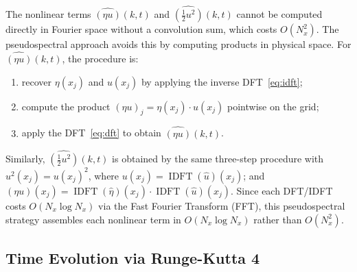 The nonlinear terms $\widehat{(\eta u)}(k,t)$ and $\widehat{(\frac{1}{2}u^2)}(k,t)$ cannot be computed directly in Fourier space without a convolution sum, which costs $O(N_x^2)$. The pseudospectral approach avoids this by computing products in physical space. For $\widehat{(\eta u)}(k,t)$, the procedure is:
\begin{enumerate}
    \item recover $\eta(x_j)$ and $u(x_j)$ by applying the inverse DFT~\eqref{eq:idft};
    \item compute the product $(\eta u)_j = \eta(x_j)\cdot u(x_j)$ pointwise on the grid;
    \item apply the DFT~\eqref{eq:dft} to obtain $\widehat{(\eta u)}(k,t)$.
\end{enumerate}
Similarly, $\widehat{(\frac{1}{2}u^2)}(k,t)$ is obtained by the same three-step procedure with $u^2(x_j) = u(x_j)^2$, where $u(x_j) = \operatorname{IDFT}(\hat{u})(x_j)$; and $(\eta u)(x_j) = \operatorname{IDFT}(\hat{\eta})(x_j)\cdot\operatorname{IDFT}(\hat{u})(x_j)$. Since each DFT/IDFT costs $O(N_x \log N_x)$ via the Fast Fourier Transform (FFT), this pseudospectral strategy assembles each nonlinear term in $O(N_x \log N_x)$ rather than $O(N_x^2)$.

\subsection{Time Evolution via Runge-Kutta 4}
\label{subsec:rk4}

